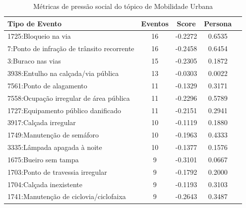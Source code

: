 \begin{table}[htbp]
	\centering
	\caption{Métricas de pressão social do tópico de Mobilidade Urbana}
	\label{tab:eventos_populares_mobility}
	\begin{tabular}{|l|c|c|c|c|}
		\hline
		\textbf{Tipo de Evento}                         & \textbf{Eventos} & \textbf{Score} & \textbf{Persona} \\
		\hline
		1725:Bloqueio na via                            & 16               & -0.2272        & 0.6535           \\
		\hline
		7:Ponto de infração de trânsito recorrente      & 16               & -0.2458        & 0.6454           \\
		\hline
		3:Buraco nas vias                               & 15               & -0.2305        & 0.1872           \\
		\hline
		3938:Entulho na calçada/via pública             & 13               & -0.0303        & 0.0022           \\
		\hline
		7561:Ponto de alagamento                        & 11               & -0.1329        & 0.3171           \\
		\hline
		7558:Ocupação irregular de área pública         & 11               & -0.2296        & 0.5789           \\
		\hline
		1727:Equipamento público danificado             & 11               & -0.2151        & 0.2941           \\
		\hline
		3917:Calçada irregular                          & 10               & -0.1119        & 0.1880           \\
		\hline
		1749:Manutenção de semáforo                     & 10               & -0.1963        & 0.4333           \\
		\hline
		3335:Lâmpada apagada à noite                    & 10               & -0.1377        & 0.1576           \\
		\hline
		1675:Bueiro sem tampa                           & 9                & -0.3101        & 0.0667           \\
		\hline
		1703:Ponto de travessia irregular               & 9                & -0.1792        & 0.2000           \\
		\hline
		1704:Calçada inexistente                        & 9                & -0.1193        & 0.3103           \\
		\hline
		1741:Manutenção de ciclovia/ciclofaixa          & 9                & -0.2643        & 0.3487           \\

\end{tabular}
\end{table}
